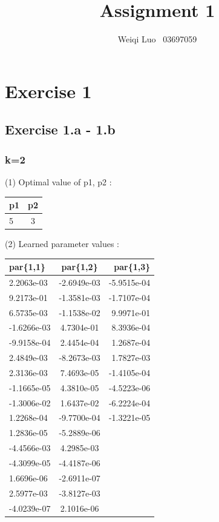 \documentclass{article}
\begin{document}
\title{Assignment 1}
\author{Weiqi Luo \ 03697059}

\maketitle
\newpage

\section*{Exercise 1}

\subsection*{Exercise 1.a - 1.b}
\subsubsection*{k=2}
(1) Optimal value of p1, p2 :  \\
\begin{center}
	\begin{tabular}{ l | c }
		\hline
		p1 & p2 \\ \hline		
		5 & 3 \\ \hline
	\end{tabular}
\end{center}
(2) Learned parameter values : \\
\begin{center}
	\begin{tabular}{ l | c | r  }
		\hline
		par\{1,1\}& par\{1,2\} & par\{1,3\} \\
		\hline		
	   2.2063e-03 & -2.6949e-03 & -5.9515e-04 \\ \hline
	   9.2173e-01 & -1.3581e-03 & -1.7107e-04 \\ \hline
	   6.5735e-03 & -1.1538e-02 & 9.9971e-01 \\ \hline
	   -1.6266e-03 & 4.7304e-01 & 8.3936e-04 \\ \hline
	   -9.9158e-04 & 2.4454e-04 & 1.2687e-04 \\ \hline
	   2.4849e-03 & -8.2673e-03 & 1.7827e-03 \\ \hline
	   2.3136e-03 & 7.4693e-05 & -1.4105e-04 \\ \hline
	   -1.1665e-05 & 4.3810e-05 & -4.5223e-06 \\ \hline
	   -1.3006e-02 & 1.6437e-02 & -6.2224e-04 \\ \hline
	   1.2268e-04 & -9.7700e-04 & -1.3221e-05 \\ \hline
	   1.2836e-05 & -5.2889e-06 &  \\ \hline
	   -4.4566e-03 & 4.2985e-03 &  \\ \hline
	   -4.3099e-05 & -4.4187e-06 &  \\ \hline
	   1.6696e-06 & -2.6911e-07 &  \\ \hline
	   2.5977e-03 & -3.8127e-03 &  \\ \hline
	   -4.0239e-07 & 2.1016e-06 &  \\ \hline
	\end{tabular}
\end{center}
\newpage
\end{document}
